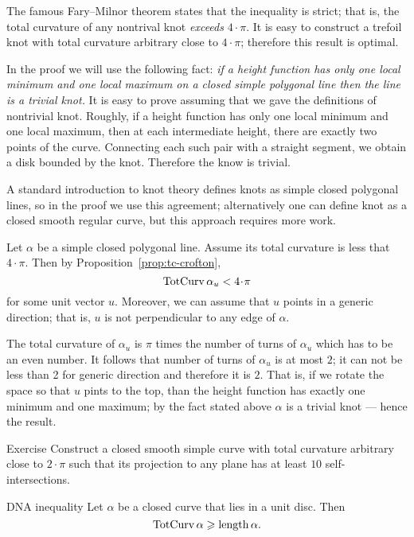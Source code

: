 The famous Fary--Milnor theorem states that the inequality is strict;
that is, the total curvature of any nontrival knot \emph{exceeds} $4\cdot\pi$.
It is easy to construct a trefoil knot with total curvature arbitrary close to $4\cdot\pi$;
therefore this result is optimal.

In the proof we will use the following fact: \emph{if a height function has only one local minimum and one local maximum on a closed simple polygonal line then the line is a trivial knot.}
It is easy to prove assuming that we gave the definitions of nontrivial knot.
Roughly, if a height function has only one local minimum and one local maximum, then at each intermediate height, there are
exactly two points of the curve.
Connecting each such pair with a straight segment, we obtain a disk bounded by the knot.
Therefore the know is trivial.


A standard introduction to knot theory defines knots as simple closed polygonal lines, so in the proof we use this agreement; alternatively one can define knot as a closed smooth regular curve, but this approach requires more work.

Let $\alpha$ be a simple closed polygonal line.
Assume its total curvature is less that $4\cdot\pi$.
Then by Proposition~\ref{prop:tc-crofton}, 
\[\tc\alpha_u<4\cdot\pi\]
for some unit vector $u$.
Moreover, we can assume that $u$ points in a generic direction;
that is, $u$ is not perpendicular to any edge of $\alpha$.

The total curvature of $\alpha_u$ is $\pi$ times the number of turns of $\alpha_u$
which has to be an even number.
It follows that number of turns of $\alpha_u$ is at most $2$;
it can not be less than 2 for generic direction and therefore it is $2$.
That is, if we rotate the space so that $u$ pints to the top,
than the height function has exactly one minimum and one maximum;
by the fact stated above $\alpha$ is a trivial knot --- hence the result.
\qeds

\begin{thm}{Exercise}
Construct a closed smooth simple curve with total curvature arbitrary close to $2\cdot\pi$ such that its projection to any plane has at least $10$ self-intersections.   
\end{thm}


\begin{thm}{DNA inequality}
Let $\alpha$ be a closed curve that lies in a unit disc.
Then 
\[\mathop{\rm TotCurv}\nolimits\alpha\geqslant \mathop{\rm length}\nolimits\alpha.\]
\end{thm}

